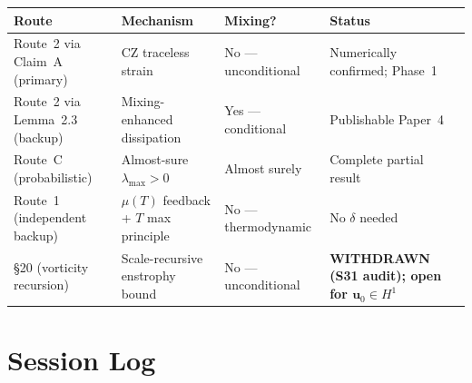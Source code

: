\documentclass[11pt, a4paper]{article}
\theoremstyle{definition}
\theoremstyle{remark}
\newcommand{\delt}{\delta}
\begin{document}
\begin{center}
\begin{tabular}{llll}
\toprule
\textbf{Route} & \textbf{Mechanism} & \textbf{Mixing?} & \textbf{Status} \\
\midrule
Route~2 via Claim~A (primary) & CZ traceless strain & No --- unconditional & Numerically confirmed; Phase~1 \\
Route~2 via Lemma~2.3 (backup) & Mixing-enhanced dissipation & Yes --- conditional & Publishable Paper~4 \\
Route~C (probabilistic) & Almost-sure $\lambda_{\max} > 0$ & Almost surely & Complete partial result \\
Route~1 (independent backup) & $\mu(T)$ feedback + $T$ max principle & No --- thermodynamic & No $\delt$ needed \\
\S20 (vorticity recursion) & Scale-recursive enstrophy bound & No --- unconditional & \textbf{WITHDRAWN (S31 audit); open for $\mathbf{u}_0\in H^1$} \\
\bottomrule
\end{tabular}
\end{center}

\section{Session Log}
\label{app:session-log}
\end{document}
